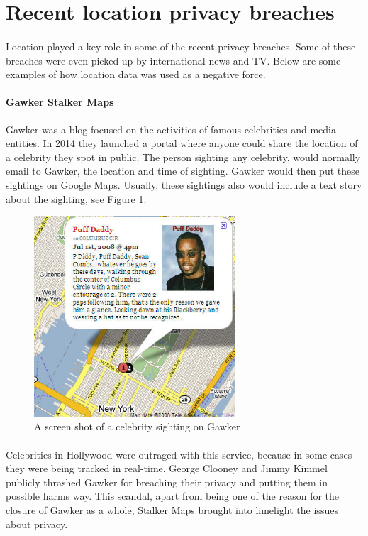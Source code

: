 \documentclass[12pt]{report}
\theoremstyle{named}
\begin{document}
\section{Recent location privacy breaches}
\paragraph{}
Location played a key role in some of the recent privacy breaches. Some of these breaches were even picked up by international news and TV. Below are some examples of how location data was used as a negative force.

\paragraph{Gawker Stalker Maps\cite{GawkerURL}} Gawker was a blog focused on the activities of famous celebrities and media entities. In 2014 they launched a portal where anyone could share the location of a celebrity they spot in public. The person sighting any celebrity, would normally email to Gawker, the location and time of sighting. Gawker would then put these sightings on Google Maps. Usually, these sightings also would include a text story about the sighting, see Figure \ref{fig:Gawker}. 

\begin{figure}[ht]
\centering
        \includegraphics[width=75mm,scale=0.5]{Images/gawker-stalker.jpg}
    \caption{A screen shot of a celebrity sighting on Gawker}
    \label{fig:Gawker}
\end{figure}
\paragraph{}
Celebrities in Hollywood were outraged with this service, because in some cases they were being tracked in real-time. George Clooney and Jimmy Kimmel publicly thrashed Gawker for breaching their privacy and putting them in possible harms way. This scandal, apart from being one of the reason for the closure of Gawker as a whole, Stalker Maps brought into limelight the issues about privacy.
\end{document}
